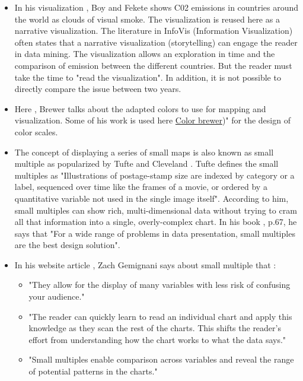 \documentclass[preprint,journal]{vgtc}       %
\begin{document}
\begin{itemize}[leftmargin=*,parsep=0cm]
\item In his visualization \cite{Boy:2014:TCP}, Boy and Fekete shows C02 emissions in countries around the world as clouds of visual smoke. The visualization is reused here \cite{Mediapart:2014:CPM} as a narrative visualization. The literature in InfoVis (Information Visualization) often states that a narrative visualization (storytelling) can engage the reader in data mining. The visualization allows an exploration in time and the comparison of emission between the different countries. But the reader must take the time to "read the visualization". In addition, it is not possible to directly compare the issue between two years.

\item Here \cite{Brewer:1994:CUG} , Brewer talks about the adapted colors to use for mapping and visualization. Some of his work is used here \href{http://colorbrewer2.org/#type=sequential&scheme=YlGnBu&n=3}{Color brewer})" for the design of color scales.

\item The concept of displaying a series of small maps is also known as small multiple as popularized by Tufte \cite{Tufte:1983:VDQ} and Cleveland \cite{Cleveland:1985:TEG}. Tufte defines the small multiples as "Illustrations of postage-stamp size are indexed by category or a label, sequenced over time like the frames of a movie, or ordered by a quantitative variable not used in the single image itself". According to him, small multiples can show rich, multi-dimensional data without trying to cram all that information into a single, overly-complex chart. In his book \cite{Tufte:1990:ENI}, p.67, he says that "For a wide range of problems in data presentation, small multiples are the best design solution". 


\item In his website article \cite{Gemignani:2010:BKV}, Zach Gemignani says about small multiple that :
	\begin{itemize}
		\item "They allow for the display of many variables with less risk of confusing your audience."
		\item "The reader can quickly learn to read an individual chart and apply this knowledge as they scan the rest of the charts. This shifts the reader’s effort from understanding how the chart works to what the data says."
		\item "Small multiples enable comparison across variables and reveal the range of potential patterns in the charts."
	\end{itemize}


\end{itemize}
\end{document}
